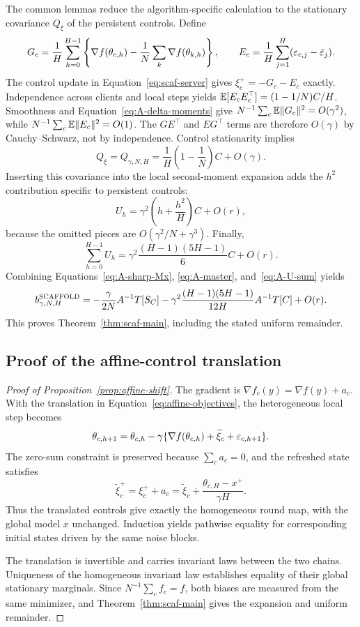 The common lemmas reduce the algorithm-specific calculation to the
stationary covariance $Q_\xi$ of the persistent controls. Define
\begin{equation}
\label{eq:A-GE}
 G_c=\frac1H\sum_{h=0}^{H-1}
 \left\{\nabla f(\theta_{c,h})-\frac1N\sum_k\nabla f(\theta_{k,h})\right\},
 \qquad E_c=\frac1H\sum_{j=1}^H(\varepsilon_{c,j}-\bar{\varepsilon}_j).
\end{equation}
The control update in Equation~\eqref{eq:scaf-server} gives
$\xi_c^+=-G_c-E_c$ exactly. Independence across clients and local steps yields
$\mathbb{E}[E_cE_c^\top]=(1-1/N)C/H$. Smoothness and
Equation~\eqref{eq:A-delta-moments} give
$N^{-1}\sum_c\mathbb{E}\|G_c\|^2=O(\gamma^2)$, while
$N^{-1}\sum_c\mathbb{E}\|E_c\|^2=O(1)$.
The $GE^\top$ and $EG^\top$ terms are therefore $O(\gamma)$ by
Cauchy--Schwarz, not by independence. Control stationarity implies
\begin{equation}
\label{eq:A-Q}
 Q_\xi=Q_{\gamma,N,H}=\frac1H\left(1-\frac1N\right)C+O(\gamma).
\end{equation}
Inserting this covariance into the local second-moment expansion adds
the $h^2$ contribution specific to persistent controls:
\begin{equation}
\label{eq:A-U}
 U_h=\gamma^2\left(h+\frac{h^2}{H}\right)C+O(r),
\end{equation}
because the omitted pieces are $O(\gamma^2/N+\gamma^3)$.
Finally,
\begin{equation}
\label{eq:A-U-sum}
 \sum_{h=0}^{H-1}U_h
 =\gamma^2\frac{(H-1)(5H-1)}6C+O(r).
\end{equation}
Combining Equations~\eqref{eq:A-sharp-Mx}, \eqref{eq:A-master},
and~\eqref{eq:A-U-sum} yields
\[
 b^{\textnormal{\textsc{SCAFFOLD}}}_{\gamma,N,H}
 =-\frac{\gamma}{2N}A^{-1}T[S_C]
 -\gamma^2\frac{(H-1)(5H-1)}{12H}A^{-1}T[C]+O(r).
\]
This proves Theorem~\ref{thm:scaf-main}, including the stated uniform remainder.


\subsection{Proof of the affine-control translation}
\label{app:affine-proof}
\begin{proof}[Proof of Proposition~\ref{prop:affine-shift}]
The gradient is $\nabla f_c(y)=\nabla f(y)+a_c$. With the translation in Equation~\eqref{eq:affine-objectives}, the heterogeneous local step becomes
\[
\theta_{c,h+1}=\theta_{c,h}-\gamma\{\nabla f(\theta_{c,h})+\widetilde\xi_c+\varepsilon_{c,h+1}\}.
\]
The zero-sum constraint is preserved because $\sum_ca_c=0$, and the refreshed state satisfies
\[
\widetilde\xi_c^+=\xi_c^++a_c
=\widetilde\xi_c+\frac{\theta_{c,H}-x^+}{\gamma H}.
\]
Thus the translated controls give exactly the homogeneous round map,
with the global model $x$ unchanged. Induction yields pathwise equality
for corresponding initial states driven by the same noise blocks.

The translation is invertible and carries invariant laws between the
two chains. Uniqueness of the homogeneous invariant law establishes
equality of their global stationary marginals. Since
$N^{-1}\sum_cf_c=f$, both biases are measured from the same minimizer,
and Theorem~\ref{thm:scaf-main} gives the expansion and uniform remainder.
\end{proof}
